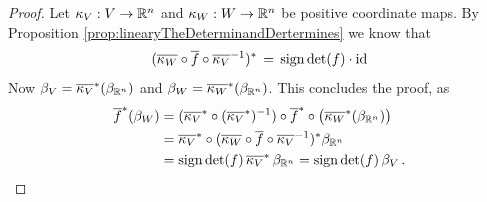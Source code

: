 \begin{proof}
    Let $\kappa_V:V\to \mathbb{R}^n$ and $\kappa_W:W\to \mathbb{R}^n$ be positive coordinate maps.
    By Proposition \ref{prop:linearyTheDeterminandDertermines} we know that \begin{equation*}
        (\overline{\kappa_W}\circ \overline{f} \circ \overline{\kappa_V}^{-1})^*\,=\,\mathrm{sign} \det(f)\cdot \operatorname{\mathrm{id}}
    \end{equation*} Now $\beta_V=\overline{\kappa_V}^*(\beta_{\mathbb{R}^n})$ and  $\beta_W=\overline{\kappa_W}^*(\beta_{\mathbb{R}^n})$. This concludes the proof, as
    \begin{align*}
        \overline{f}^*(\beta_W)
        &=(\overline{\kappa_V}^*\circ (\overline{\kappa_V}^*)^{-1})\circ \overline{f}^*\circ\big(\overline{\kappa_W}^*(\beta_{\mathbb{R}^n})\big)\\
        &=\overline{\kappa_V}^*\circ (\overline{\kappa_W} \circ \overline{f} \circ \overline{\kappa_V}^{-1})^*\beta_{\mathbb{R}^n}\\
        &=\mathrm{sign} \det(f)\,\overline{\kappa_V}^*\,\beta_{\mathbb{R}^n}=\mathrm{sign} \det(f)\,\beta_V\,.
    \end{align*}
\end{proof}

